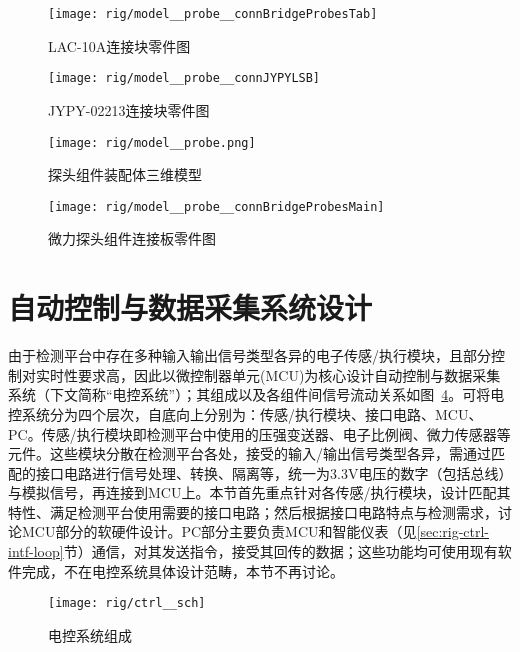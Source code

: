 \begin{figure}[p]
\centering
\texttt{[image: rig/model\_\_probe\_\_connBridgeProbesTab]}
\caption{LAC-10A连接块零件图}
\label{fig:rig-model-probe-connBridgeProbesTab}

\centering
\texttt{[image: rig/model\_\_probe\_\_connJYPYLSB]}
\caption{JYPY-02213连接块零件图}
\label{fig:rig-model-probe-connJYPYLSB}
\end{figure}

\begin{figure}[p]
\centering
\texttt{[image: rig/model\_\_probe.png]}
\caption{探头组件装配体三维模型}
\label{fig:rig-model-probe}
\end{figure}

\begin{figure}[p]
\centering
\texttt{[image: rig/model\_\_probe\_\_connBridgeProbesMain]}
\caption{微力探头组件连接板零件图}
\label{fig:rig-model-probe-connBridgeProbesMain}
\end{figure}





\clearpage



\section{自动控制与数据采集系统设计}\label{sec:rig-ctrl}

由于检测平台中存在多种输入输出信号类型各异的电子传感/执行模块，且部分控制对实时性要求高，因此以微控制器单元(MCU)为核心设计自动控制与数据采集系统（下文简称“电控系统”）；其组成以及各组件间信号流动关系如图~\ref{fig:rig-ctrl-sch}。可将电控系统分为四个层次，自底向上分别为：传感/执行模块、接口电路、MCU、PC。传感/执行模块即检测平台中使用的压强变送器、电子比例阀、微力传感器等元件。这些模块分散在检测平台各处，接受的输入/输出信号类型各异，需通过匹配的接口电路进行信号处理、转换、隔离等，统一为3.3V电压的数字（包括总线）与模拟信号，再连接到MCU上。本节首先重点针对各传感/执行模块，设计匹配其特性、满足检测平台使用需要的接口电路；然后根据接口电路特点与检测需求，讨论MCU部分的软硬件设计。PC部分主要负责MCU和智能仪表（见\ref{sec:rig-ctrl-intf-loop}节）通信，对其发送指令，接受其回传的数据；这些功能均可使用现有软件完成，不在电控系统具体设计范畴，本节不再讨论。

\begin{figure}[h]
\centering
\texttt{[image: rig/ctrl\_\_sch]}
\caption{电控系统组成}
\label{fig:rig-ctrl-sch}
\end{figure}



